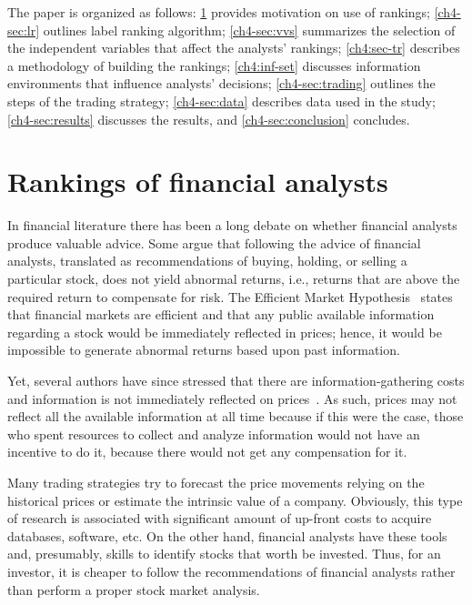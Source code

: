 \documentclass[a4paper,12pt,openright,notitlepage]{report}\usepackage[]{graphicx}\usepackage[]{color}
\begin{document}
The paper is organized as follows: \ref{ch4-sec:ranking} provides motivation on use of rankings; \ref{ch4-sec:lr} outlines label ranking algorithm; \ref{ch4-sec:vvs} summarizes the selection of the independent variables that affect the analysts' rankings; \ref{ch4:sec-tr} describes a methodology of building the rankings; \ref{ch4:inf-set} discusses information environments that influence analysts' decisions; \ref{ch4-sec:trading} outlines the steps of the trading strategy; \ref{ch4-sec:data} describes data used in the study; \ref{ch4-sec:results} discusses the results, and \ref{ch4-sec:conclusion} concludes.

\section{Rankings of financial  analysts}
\label{ch4-sec:ranking}
In  financial literature there has been a long debate on whether financial analysts produce valuable  advice. Some argue that following the advice of financial analysts,  translated as recommendations of buying, holding, or selling a particular stock, does not yield  abnormal returns, i.e.,  returns that are above the required return to compensate for risk. The Efficient Market Hypothesis~\citep{fama1970ecm} states that financial markets are efficient and that any public available information  regarding a stock would be immediately reflected in prices; hence, it would be  impossible to generate abnormal returns based upon past information.

Yet, several authors have since stressed that  there are information-gathering costs and information is not immediately reflected on prices~\citep{grossman1980iie}. As such, prices may not  reflect all the available information at all time because if this were the case, those who spent resources to collect and analyze   information would not have an incentive to do it, because there would not get any compensation for it.

Many trading strategies try to forecast the price movements relying on the historical prices or estimate the intrinsic value of a company. Obviously, this type of research is associated with significant amount of up-front costs to acquire databases, software, etc. On the other hand, financial analysts have these tools and, presumably, skills to identify  stocks that worth be invested. Thus, for an investor, it is cheaper to follow the recommendations of financial analysts rather than perform a proper stock market analysis.
\end{document}
